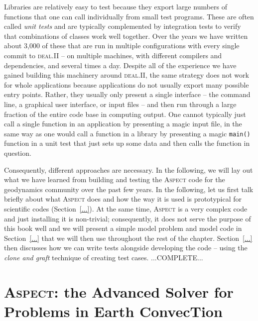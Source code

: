 \documentclass{article}
\newcommand{\dealii}{{\textsc{deal.II}}}
\newcommand{\aspect}{\textsc{Aspect}}
\begin{document}
Libraries are relatively easy to test because they export large numbers of
functions that one can call individually from small test programs. These are
often called \textit{unit tests} and are typically complemented by integration
tests to verify that combinations of classes work well together. Over the
years we have written about 3,000 of these that are run in multiple
configurations with every single commit to \dealii{} -- on multiple machines,
with different compilers and dependencies, and several times a day. Despite
all of the experience we have gained building this machinery around \dealii{},
the same strategy does not work for whole applications because applications do
not usually export many possible entry points. Rather, they usually only
present a single interface -- the command line, a graphical user interface, or
input files -- and then run through a large fraction of the entire code base
in computing output. One cannot typically just call a single function in an
application by presenting a magic input file, in the same way as one would
call a function in a library by presenting a magic \texttt{main()} function in
a unit test that just sets up some data and then calls the function in
question.

Consequently, different approaches are necessary. In the following, we will
lay out what we have learned from building and testing the \aspect{} code for the
geodynamics community over the past few years. In the following, let us first
talk briefly about what \aspect{} does and how the way it is used is
prototypical for scientific codes (Section~\ref{...}). At the same time,
\aspect{} is a very complex code and just installing it is non-trivial;
consequently, it does not serve the purpose of this book well and we will
present a simple model problem and model code in Section~\ref{...} that we
will then use throughout the rest of the chapter. Section~\ref{...} then
discusses how we can write tests alongside developing the code -- using the
\textit{clone and graft} technique of creating test cases. ...COMPLETE...


\section{\aspect{}: the Advanced Solver for Problems in Earth ConvecTion}
\end{document}
